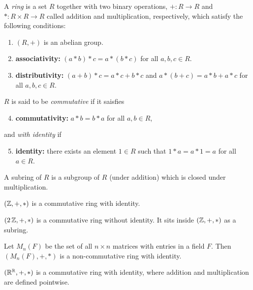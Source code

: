 \begin{definition*}[Ring] \label{def:ring_again}
    A \emph{ring} is a set $R$ together with two binary operations,
    $+\colon R \to R$ and $*\colon R \times R \to R$ called addition and
    multiplication, respectively, which satisfy the following conditions:
    \begin{enumerate}[label=\small(R\arabic*)]
        \item $(R, +)$ is an abelian group.
        \item \textbf{associativity:}
            $(a * b) * c = a * (b * c)$ for all $a, b, c \in R$.
        \item \textbf{distributivity:}
            $(a + b) * c = a * c + b * c$ and
            $a * (b + c) = a * b + a * c$ for all $a, b, c \in R$.
    \end{enumerate}
    $R$ is said to be \emph{commutative} if it saisfies
    \begin{enumerate}[label=\small(R\arabic*)]
        \setcounter{enumi}{3}
        \item \textbf{commutativity:}
            $a * b = b * a$ for all $a, b \in R$,
    \end{enumerate}
    and \emph{with identity} if
    \begin{enumerate}[label=\small(R\arabic*)]
        \setcounter{enumi}{4}
        \item \textbf{identity:}
            there exists an element $1 \in R$ such that
            $1 * a = a * 1 = a$ for all $a \in R$.
    \end{enumerate}
    A subring of $R$ is a subgroup of $R$ (under addition) which is closed
    under multiplication.
\end{definition*}
\begin{examples}
    \item $(\mathbb{Z}, +, *)$ is a commutative ring with identity.
    \item $(2\,\mathbb{Z}, +, *)$ is a commutative ring without identity.
    It sits inside $(\mathbb{Z}, +, *)$ as a subring.
    \item Let $M_n(F)$ be the set of all $n \times n$ matrices with entries
    in a field $F$.
    Then $(M_n(F), +, *)$ is a non-commutative ring with identity.
    \item $(\mathbb{R}^{\mathbb{R}}, +, *)$ is a commutative ring with identity, where
    addition and multiplication are defined pointwise.
\end{examples}

